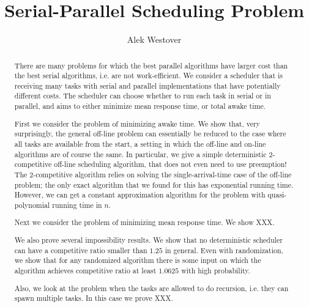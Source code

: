\documentclass[twocolumn]{article}[10pt]
\author{Alek Westover}
\title{Serial-Parallel Scheduling Problem}
\newcommand{\todo}[1]{{\color{red}\textbf{TODO:} #1}}
\begin{document}
\maketitle

\begin{abstract}
There are many problems for which the best parallel algorithms
have larger cost than the best serial algorithms, i.e. are not
work-efficient. We consider a scheduler that is receiving many
tasks with serial and parallel implementations that have
potentially different costs. The scheduler can choose whether to
run each task in serial or in parallel, and aims to either
minimize mean response time, or total awake time. 

First we consider the problem of minimizing awake time. We show
that, very surprisingly, the general off-line problem can
essentially be reduced to the case where all tasks are available
from the start, a setting in which the off-line and on-line
algorithms are of course the same. In particular, we give a
simple deterministic $2$-competitive off-line scheduling
algorithm, that does not even need to use preemption! 
The $2$-competitive algorithm relies on solving the
single-arrival-time case of the off-line problem; the only exact
algorithm that we found for this has exponential running time.
However, we can get a constant approximation algorithm for the
problem with quasi-polynomial running time in $n$.

Next we consider the problem of minimizing mean response time.
We show XXX.

We also prove several impossibility results.
We show that no deterministic scheduler can have a
competitive ratio smaller than $1.25$ in general.
Even with randomization, we show that for any randomized
algorithm there is some input on which the algorithm achieves
competitive ratio at least $1.0625$ with high probability.

Also, we look at the problem when the tasks are allowed to do
recursion, i.e. they can spawn multiple tasks. In this case we
prove XXX.
\end{abstract}




% 




\end{document}
